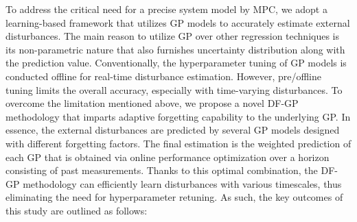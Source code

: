 To address the critical need for a precise system model by MPC, we adopt a learning-based framework that utilizes \ac{GP} models to accurately estimate external disturbances. The main reason to utilize \ac{GP} over other regression techniques is its non-parametric nature that also furnishes uncertainty distribution along with the prediction value. Conventionally, the hyperparameter tuning of \ac{GP} models is conducted offline for real-time disturbance estimation. However, pre/offline tuning limits the overall accuracy, especially with time-varying disturbances. To overcome the limitation mentioned above, we propose a novel \ac{DF-GP}  methodology that imparts adaptive forgetting capability to the underlying \ac{GP}. In essence, the external disturbances are predicted by several \ac{GP} models designed with different forgetting factors. The final estimation is the weighted prediction of each \ac{GP} that is obtained via online performance optimization over a horizon consisting of past measurements. Thanks to this optimal combination, the \ac{DF-GP} methodology can efficiently learn disturbances with various timescales, thus eliminating the need for hyperparameter retuning. As such, the key outcomes of this study are outlined as follows:






